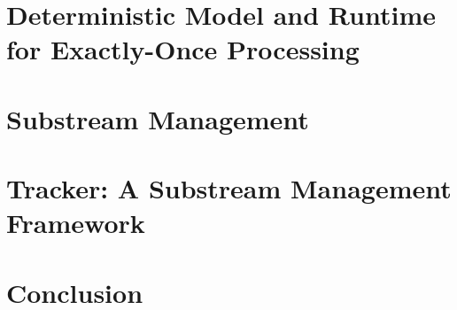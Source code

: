 \documentclass[a4paper, 12pt, oneside]{Thesis}  %
\theoremstyle{definition}
\begin{document}
\chapter{Deterministic Model and Runtime for Exactly-Once Processing}
\label{thesis-chapther-optimistic}


\chapter{Substream Management}
\label{thesis-chapter-substreams-consistency}


\chapter{Tracker: A Substream Management Framework}
\label{thesis-chapter-tracker}


\chapter{Conclusion}
\label{thesis-chapter-conclusion}










\appendix %




\backmatter

\label{references}
\end{document}
